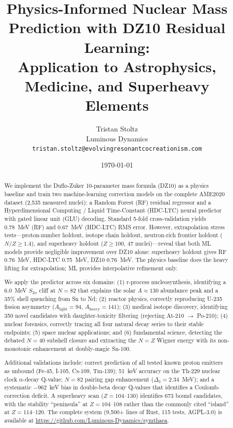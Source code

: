 \documentclass[twocolumn,letterpaper,10pt]{article}
\begin{document}
\title{Physics-Informed Nuclear Mass Prediction with DZ10 Residual Learning:\\
Application to Astrophysics, Medicine, and Superheavy Elements}

\author{Tristan Stoltz \\
\small Luminous Dynamics \\
\small \texttt{tristan.stoltz@evolvingresonantcocreationism.com}}

\date{\today}

\begin{abstract}
We implement the Duflo-Zuker 10-parameter mass formula (DZ10) as a physics
baseline and train two machine-learning correction models on the complete
AME2020 dataset (2,535 measured nuclei): a Random Forest (RF) residual
regressor and a Hyperdimensional Computing / Liquid Time-Constant (HDC-LTC)
neural predictor with gated linear unit (GLU) decoding. Standard 5-fold
cross-validation yields 0.78~MeV (RF) and 0.67~MeV (HDC-LTC) RMS error.
However, extrapolation stress tests---proton-number holdout, isotope chain
holdout, neutron-rich frontier holdout ($N/Z \geq 1.4$), and superheavy
holdout ($Z \geq 100$, 47 nuclei)---reveal that both ML models provide
negligible improvement over DZ10 alone: superheavy holdout gives RF
0.76~MeV, HDC-LTC 0.75~MeV, DZ10 0.76~MeV. The physics baseline does the
heavy lifting for extrapolation; ML provides interpolative refinement only.

We apply the predictor across six domains: (1) r-process nucleosynthesis,
identifying a 6.0~MeV $S_{2n}$ cliff at $N=82$ that explains the solar
$A \approx 130$ abundance peak and a 35\% shell quenching from Sn to Nd;
(2) reactor physics, correctly reproducing U-235 fission asymmetry
($A_\text{light}=94$, $A_\text{heavy}=141$); (3) medical isotope
discovery, identifying 350 novel candidates with daughter-toxicity
filtering (rejecting At-210 $\to$ Po-210); (4) nuclear forensics,
correctly tracing all four natural decay series to their stable endpoints;
(5) space nuclear applications; and (6) fundamental science, detecting the
debated $N=40$ subshell closure and extracting the $N=Z$ Wigner energy
with its non-monotonic enhancement at doubly-magic Sn-100.

Additional validations include: correct prediction of all tested known
proton emitters as unbound (Fe-45, I-105, Cs-109, Tm-139); 51~keV
accuracy on the Th-229 nuclear clock $\alpha$-decay Q-value; $N=82$
pairing gap enhancement ($\Delta_3 = 2.34$~MeV); and a systematic
$-962$~keV bias in double-beta decay Q-values that identifies a
Coulomb-correction deficit. A superheavy scan ($Z=104$--130) identifies
673 bound candidates, with the stability ``peninsula'' at $Z=104$--108
rather than the commonly cited ``island'' at $Z=114$--120. The complete
system (9,500+ lines of Rust, 115 tests, AGPL-3.0) is available at
\url{https://github.com/Luminous-Dynamics/symthaea}.
\end{abstract}
\end{document}
